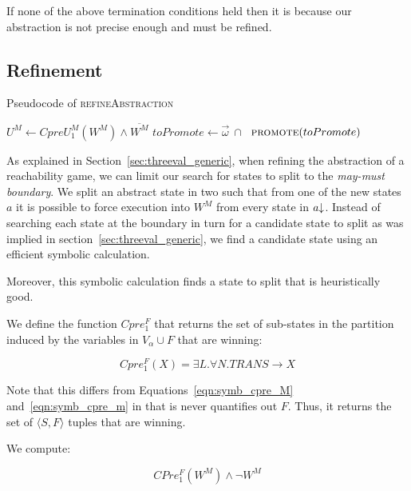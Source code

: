 If none of the above termination conditions held then it is because our abstraction is not precise enough and must be refined.

\subsection{Refinement}

\begin{algorithm}

\caption{Pseudocode of \textsc{refineAbstraction}}
\label{alg:refineAbstraction}

\begin{algorithmic}[1]
    \State $U^M \gets CpreU_1^M(W^M) \land \overline{W^M}$
    \State $toPromote \gets \vec{\omega}~\cap~$ \label{a:ra:extract_prime}
    \State $\Call{promote}{toPromote}$
\EndFunction
\end{algorithmic}
\end{algorithm}

As explained in Section~\ref{sec:threeval_generic}, when refining the abstraction of a reachability game, we can limit our search for states to split to the \emph{may-must boundary}. We split an abstract state in two such that from one of the new states $a$ it is possible to force execution into $W^M$ from every state in $a\mathord{\downarrow}$. Instead of searching each state at the boundary in turn for a candidate state to split as was implied in section~\ref{sec:threeval_generic}, we find a candidate state using an efficient symbolic calculation.

Moreover, this symbolic calculation finds a state to split that is heuristically good.

We define the function $Cpre_1^F$ that returns the set of sub-states in the partition induced by the variables in $V_{\alpha} \cup F$ that are winning:

\begin{equation}
    Cpre_1^F(X) = \exists L. \forall N. TRANS \rightarrow X
\end{equation}

Note that this differs from Equations~\ref{eqn:symb_cpre_M} and~\ref{eqn:symb_cpre_m} in that is never quantifies out $F$. Thus, it returns the set of $\langle S, F \rangle$ tuples that are winning.

We compute:

\begin{equation}
    CPre_1^F(W^M) \wedge \neg W^M
\end{equation}

